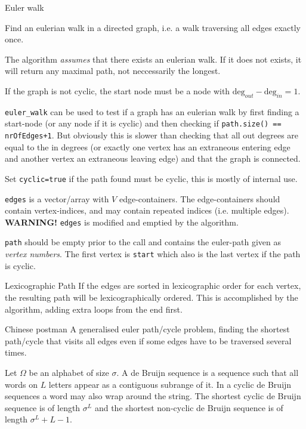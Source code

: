 
\begin{algorithm}{Euler walk}

\desc
Find an eulerian walk in a directed graph, i.e. a walk traversing all
edges exactly once.

The algorithm \emph{assumes} that there exists an eulerian walk. If it does not
exists, it will return any maximal path, not neccessarily the longest.

If the graph is not cyclic, the start node must be a node with
$\mathrm{deg}_{out}-\mathrm{deg}_{in} = 1$.

{\tt euler\_walk} can be used to test if a graph has an eulerian walk by first
finding a start-node (or any node if it is cyclic) and then checking
if {\tt path.size() == nrOfEdges+1}. But obviously this is slower than checking
that all out degrees are equal to the in degrees (or exactly one vertex has
an extraneous entering edge and another vertex an extraneous leaving edge) and
that the graph is connected.

Set {\tt cyclic=true} if the path found must be cyclic, this is mostly of
internal use.

{\tt edges} is a vector/array with $V$ edge-containers. The edge-containers
should contain vertex-indices, and may contain repeated indices
(i.e. multiple edges). {\bf WARNING!} {\tt edges} is modified and emptied by
the algorithm.

{\tt path} should be empty prior to the call and contains the euler-path
given as \emph{vertex numbers}. The first vertex is {\tt start} which also is
the last vertex if the path is cyclic.

\item[Lexicographic Path] If the edges are sorted in lexicographic order for
each vertex, the resulting path will be lexicographically ordered. This is
accomplished by the algorithm, adding extra loops from the end first.
\end{algorithm}

\begin{algorithm}{Chinese postman}
\desc
A generalised euler path/cycle problem, finding the shortest path/cycle that
visits all edges even if some edges have to be traversed several times.
\end{algorithm}

Let $\Omega$ be an alphabet of size $\sigma$. A de Bruijn sequence is a
sequence such that all words on $L$ letters appear as a contiguous subrange
of it. In a cyclic de Bruijn sequences a word may also wrap around the string.
The shortest cyclic de Bruijn sequence is of length $\sigma^L$ and the
shortest non-cyclic de Bruijn sequence is of length $\sigma^L+L-1$.

